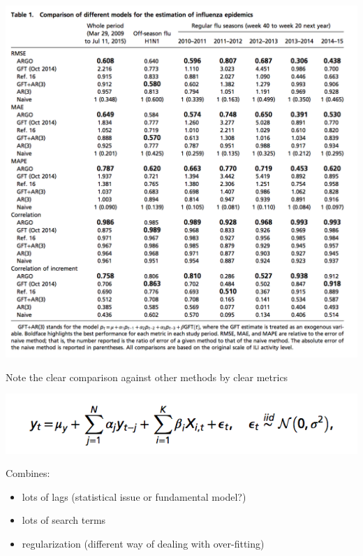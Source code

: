 \documentclass[aspectratio=169]{beamer}
\begin{document}
\begin{frame}

\begin{center}
\includegraphics[width=\textwidth]{figures/yang_accurate_2015_tab1}
\end{center}

Note the clear comparison against other methods by clear metrics

\end{frame}
\begin{frame}

\begin{center}
\includegraphics[width=\textwidth]{figures/yang_accurate_2015_eq2}
\end{center}

Combines:
\begin{itemize}
\item lots of lags (statistical issue or fundamental model?)
\item lots of search terms
\item regularization (different way of dealing with over-fitting)
\end{itemize}

\end{frame}
\end{document}
